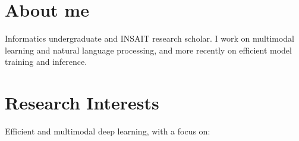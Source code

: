 



\providecommand{\relposstatus}{Under review.}






\ifdefined\industrycv
\section{About me}
\providecommand{\aboutme}{Informatics undergraduate and INSAIT research scholar. I work on multimodal learning and natural language processing, and more recently on efficient model training and inference.}
\aboutme
\vspace{-3mm}
\else
\section{Research Interests}
Efficient and multimodal deep learning, with a focus on:
\resumeFlatListStart
{}
\resumeFlatListEnd
\vspace{-1.5mm}
\fi

